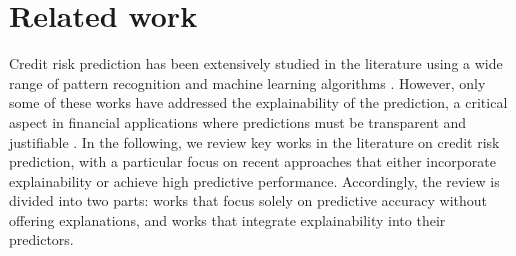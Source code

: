 \section{Related work}\label{sec:relatedworks}
{\color{blue}
    Credit risk prediction has been extensively studied in the literature using a wide range of pattern recognition and machine learning algorithms \cite{gasmi2025features, bai2025improved, dougan2025credit, aruleba2025improved, yao2025novel, liang2025application, lu2025efficient, yu2025hybrid, nguyen2025comparative, zou2025variable, zeng2025nexus, zhuang2024design, talaat2024toward, mosa2024ccfd, hartomo2025novel, ali2025explainable, zandi2025attention, pavitha2024explainable, jacobs2024benchmarking, mienye2023deep, bakhtiari2023credit, gao2023cate, sun2025enhancing, zhou2025enhancing, baisholan2025fraudx, chen2024interpretable, de2022explainable, ariza2020explainability, moscato2021benchmark, nallakaruppan2024credit, nobel2024unmasking, do2024explainable, zhao2024resampling, chang2024credit}. However, only some of these works have addressed the explainability of the prediction, a critical aspect in financial applications where predictions must be transparent and justifiable \cite{sun2025enhancing, zhou2025enhancing, ali2025explainable, hartomo2025novel, baisholan2025fraudx, chen2024interpretable, de2022explainable, ariza2020explainability, moscato2021benchmark, nallakaruppan2024credit, nobel2024unmasking, do2024explainable, chang2024credit}. In the following, we review key works in the literature on credit risk prediction, with a particular focus on recent approaches that either incorporate explainability or achieve high predictive performance. Accordingly, the review is divided into two parts: works that focus solely on predictive accuracy without offering explanations, and works that integrate explainability into their predictors.\\ %
    
}
